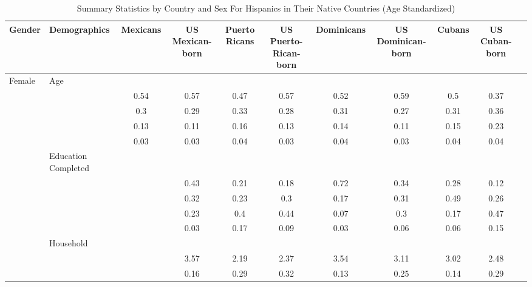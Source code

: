 \begin{table}[ht]
\centering
\caption{Summary Statistics by Country and Sex For Hispanics in Their Native Countries (Age Standardized)} 
\begingroup\small
\begin{tabular}{l>{\raggedright\arraybackslash}p{3.2cm}|ccccccccc}
  \hline
Gender & Demographics & Mexicans & US Mexican-born & Puerto Ricans & US Puerto-Rican-born & Dominicans & US Dominican-born & Cubans & US Cuban-born \\ 
  \hline
Female & Age &  &  &  &  &  &  &  &  \\ 
   & \multicolumn{1}{>{\raggedleft\arraybackslash}p{1.5cm}|}{\makebox[1.5cm][r]{60 - 69 }} & 0.54 & 0.57 & 0.47 & 0.57 & 0.52 & 0.59 & 0.5 & 0.37 \\ 
   & \multicolumn{1}{>{\raggedleft\arraybackslash}p{1.5cm}|}{\makebox[1.5cm][r]{70 - 79 }} & 0.3 & 0.29 & 0.33 & 0.28 & 0.31 & 0.27 & 0.31 & 0.36 \\ 
   & \multicolumn{1}{>{\raggedleft\arraybackslash}p{1.5cm}|}{\makebox[1.5cm][r]{80 - 89 }} & 0.13 & 0.11 & 0.16 & 0.13 & 0.14 & 0.11 & 0.15 & 0.23 \\ 
   & \multicolumn{1}{>{\raggedleft\arraybackslash}p{1.5cm}|}{\makebox[1.5cm][r]{90 plus }} & 0.03 & 0.03 & 0.04 & 0.03 & 0.04 & 0.03 & 0.04 & 0.04 \\ 
   & Education Completed &  &  &  &  &  &  &  &  \\ 
   & \multicolumn{1}{>{\raggedleft\arraybackslash}p{3.2cm}|}{\makebox[3.2cm][r]{Less than Primary }} &  & 0.43 & 0.21 & 0.18 & 0.72 & 0.34 & 0.28 & 0.12 \\ 
   & \multicolumn{1}{>{\raggedleft\arraybackslash}p{1.7cm}|}{\makebox[1.7cm][r]{Primary }} &  & 0.32 & 0.23 & 0.3 & 0.17 & 0.31 & 0.49 & 0.26 \\ 
   & \multicolumn{1}{>{\raggedleft\arraybackslash}p{2cm}|}{\makebox[2cm][r]{Secondary }} &  & 0.23 & 0.4 & 0.44 & 0.07 & 0.3 & 0.17 & 0.47 \\ 
   & \multicolumn{1}{>{\raggedleft\arraybackslash}p{2cm}|}{\makebox[2cm][r]{University }} &  & 0.03 & 0.17 & 0.09 & 0.03 & 0.06 & 0.06 & 0.15 \\ 
   & Household &  &  &  &  &  &  &  &  \\ 
   & \multicolumn{1}{>{\raggedleft\arraybackslash}p{2.7cm}|}{\makebox[2.7cm][r]{Household Size }} &  & 3.57 & 2.19 & 2.37 & 3.54 & 3.11 & 3.02 & 2.48 \\ 
   & \multicolumn{1}{>{\raggedleft\arraybackslash}p{2.2cm}|}{\makebox[2.2cm][r]{Lives Alone }} &  & 0.16 & 0.29 & 0.32 & 0.13 & 0.25 & 0.14 & 0.29 \\ 

\end{tabular}
\end{table}
